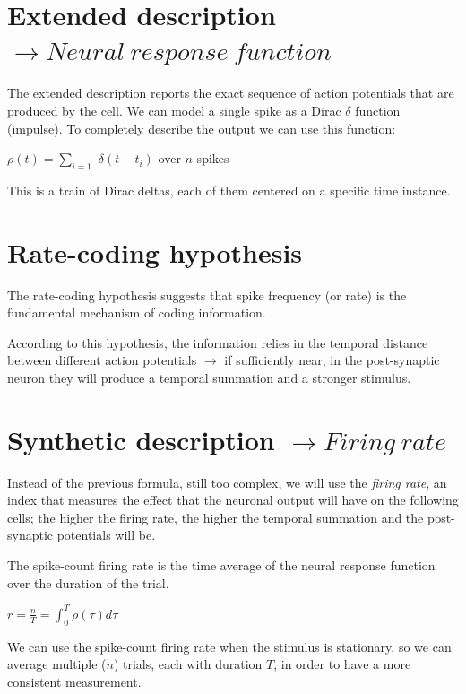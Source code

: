 \documentclass[12pt]{article}
\begin{document}
\section{Extended description $\rightarrow Neural\ response\ function$}

The extended description reports the exact sequence of action potentials that are produced by the cell. We can model a single spike as a Dirac $\delta$ function (impulse). To completely describe the output we can use this function:

\begin{center}
	$\rho (t) = \sum_{i=1}$ $\delta(t - t_i)$
	over $n$ spikes
\end{center}

This is a train of Dirac deltas, each of them centered on a specific time instance.

\section{Rate-coding hypothesis}

The rate-coding hypothesis suggests that spike frequency (or rate) is the fundamental mechanism of coding information.

According to this hypothesis, the information relies in the temporal distance between different action potentials $\rightarrow$ if sufficiently near, in the post-synaptic neuron they will produce a temporal summation and a stronger stimulus.

\section{Synthetic description $\rightarrow Firing\ rate$}

Instead of the previous formula, still too complex, we will use the \emph{firing rate}, an index that measures the effect that the neuronal output will have on the following cells; the higher the firing rate, the higher the temporal summation and the post-synaptic potentials will be.

The spike-count firing rate is the time average of the neural response function over the duration of the trial.

\begin{center}
	$r = \frac{n}{T} = \int_{0}^{T} \rho(\tau) d\tau$
\end{center}

We can use the spike-count firing rate when the stimulus is stationary, so we can average multiple ($n$) trials, each with duration $T$, in order to have a more consistent measurement.
\end{document}
